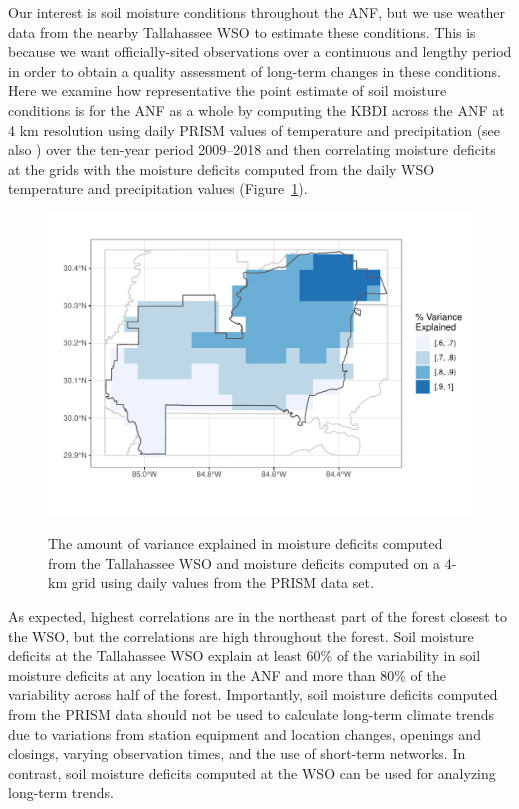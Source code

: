 \documentclass[12pt]{iopart}
\begin{document}
Our interest is soil moisture conditions throughout the ANF, but we use weather data from the nearby Tallahassee WSO to estimate these conditions. This is because we want officially-sited observations over a continuous and lengthy period in order to obtain a quality assessment of long-term changes in these conditions. Here we examine how representative the point estimate of soil moisture conditions is for the ANF as a whole by computing the KBDI across the ANF at 4 km resolution using daily PRISM values of temperature and precipitation (see also \cite{BrownEtAl2021}) over the ten-year period 2009--2018 and then correlating moisture deficits at the grids with the moisture deficits computed from the daily WSO temperature and precipitation values (Figure~\ref{VarianceExplained}).
\begin{figure}[t]
\noindent\includegraphics[scale=.8,trim=0in 0in 0in 0in,clip]{VarianceExplained.pdf}\\
\vspace{-.5in}
\caption{The amount of variance explained in moisture deficits computed from the Tallahassee WSO and moisture deficits computed on a 4-km grid using daily values from the PRISM data set.}
\label{VarianceExplained}
\end{figure}

As expected, highest correlations are in the northeast part of the forest closest to the WSO, but the correlations are high throughout the forest. Soil moisture deficits at the Tallahassee WSO explain at least 60\% of the variability in soil moisture deficits at any location in the ANF and more than 80\% of the variability across half of the forest. Importantly, soil moisture deficits computed from the PRISM data should not be used to calculate long-term climate trends due to variations from station equipment and location changes, openings and closings, varying observation times, and the use of short-term networks. In contrast, soil moisture deficits computed at the WSO can be used for analyzing long-term trends.
\end{document}
